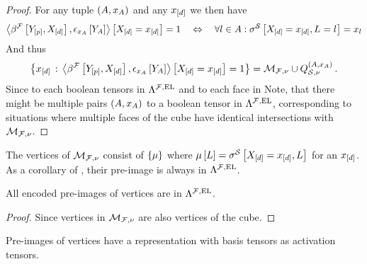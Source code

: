 \begin{proof}
	For any tuple $(A,x_{A})$ and any $x_{[d]}$ we then have
	\begin{align*}
		\left\langle \beta^{\mathcal{F}}\left[Y_{[p]},X_{[d]}\right],\epsilon_{x_{A}}\left[Y_{A}\right]\right\rangle \left[ X_{[d]}=x_{[d]} \right]=1
		\quad \Leftrightarrow \quad
		\forall{l\in A}:{\sigma^{\mathcal{S}}\left[X_{[d]}=x_{[d]},L_{}=l_{}\right]=x_{l}}
	\end{align*}
	And thus
	\begin{align*}
		\left\{x_{[d]}\,:\,\left\langle \beta^{\mathcal{F}}\left[Y_{[p]},X_{[d]}\right],\epsilon_{x_{A}}\left[Y_{A}\right]\right\rangle \left[ X_{[d]}=x_{[d]} \right]=1\right\}
		= \mathcal{M}_{\mathcal{F},\nu} \cup Q^{(A,x_{A})}_{\mathcal{S},\nu} \, .
	\end{align*}
	Since to each boolean tensors in $\Lambda^{\mathcal{F},\mathrm{EL}}$ and to each face in
	Note, that there might be multiple pairs $(A,x_{A})$ to a boolean tensor in $\Lambda^{\mathcal{F},\mathrm{EL}}$, corresponding to situations where multiple faces of the cube have identical intersections with $\mathcal{M}_{\mathcal{F},\nu}$.
\end{proof}

The vertices of $\mathcal{M}_{\mathcal{F},\nu}$ consist of $\{\mu\}$ where $\mu\left[L\right]=\sigma^{\mathcal{S}}\left[X_{[d]}=x_{[d]},L\right]$ for an $x_{[d]}$.
As a corollary of , their pre-image is always in $\Lambda^{\mathcal{F},\mathrm{EL}}$.

\begin{corollary}
	All encoded pre-images of vertices are in $\Lambda^{\mathcal{F},\mathrm{EL}}$.
\end{corollary}
\begin{proof}
	Since vertices in $\mathcal{M}_{\mathcal{F},\nu}$ are also vertices of the cube.
\end{proof}

Pre-images of vertices have a representation with basis tensors as activation tensors.

